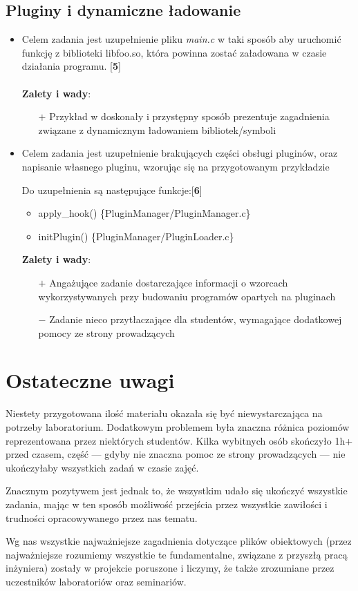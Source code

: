 \documentclass[12pt]{article}
\begin{document}
\subsection{Pluginy i dynamiczne ładowanie}
\begin{itemize}
\item Celem zadania jest uzupełnienie pliku \textit{main.c} w taki sposób aby
  uruchomić funkcję z biblioteki libfoo.so, która powinna zostać załadowana w
  czasie działania programu. [\textbf{5}]\\ \\
  \textbf{Zalety i wady}:
  \begin{itemize}
  \item[$+$] Przykład w doskonały i przystępny sposób prezentuje zagadnienia
    związane z dynamicznym ładowaniem bibliotek/symboli
  \end{itemize}

\item Celem zadania jest uzupełnienie brakujących części obsługi pluginów, oraz
  napisanie własnego pluginu, wzorując się na przygotowanym przykładzie

  Do uzupełnienia są następujące funkcje:[\textbf{6}]

  \begin{itemize}
  \item apply\_hook() \{PluginManager/PluginManager.c\}
  \item initPlugin() \{PluginManager/PluginLoader.c\}
  \end{itemize}
  \textbf{Zalety i wady}:
  \begin{itemize}
  \item[$+$] Angażujące zadanie dostarczające informacji o wzorcach
    wykorzystywanych przy budowaniu programów opartych na pluginach
  \item[$-$] Zadanie nieco przytłaczające dla studentów, wymagające dodatkowej
    pomocy ze strony prowadzących
  \end{itemize}

\end{itemize}

\section{Ostateczne uwagi}
Niestety przygotowana ilość materiału okazała się być niewystarczająca na
potrzeby laboratorium. Dodatkowym problemem była znaczna różnica poziomów
reprezentowana przez niektórych studentów. Kilka wybitnych osób skończyło 1h+
przed czasem, część --- gdyby nie znaczna pomoc ze strony prowadzących --- nie
ukończyłaby wszystkich zadań w czasie zajęć.

Znacznym pozytywem jest jednak to, że wszystkim udało się ukończyć wszystkie
zadania, mając w ten sposób możliwość przejścia przez wszystkie zawiłości i
trudności opracowywanego przez nas tematu.

Wg nas wszystkie najważniejsze zagadnienia dotyczące plików obiektowych (przez
najważniejsze rozumiemy wszystkie te fundamentalne, związane z przyszłą pracą
inżyniera) zostały w projekcie poruszone i liczymy, że także zrozumiane przez
uczestników laboratoriów oraz seminariów.
\end{document}
